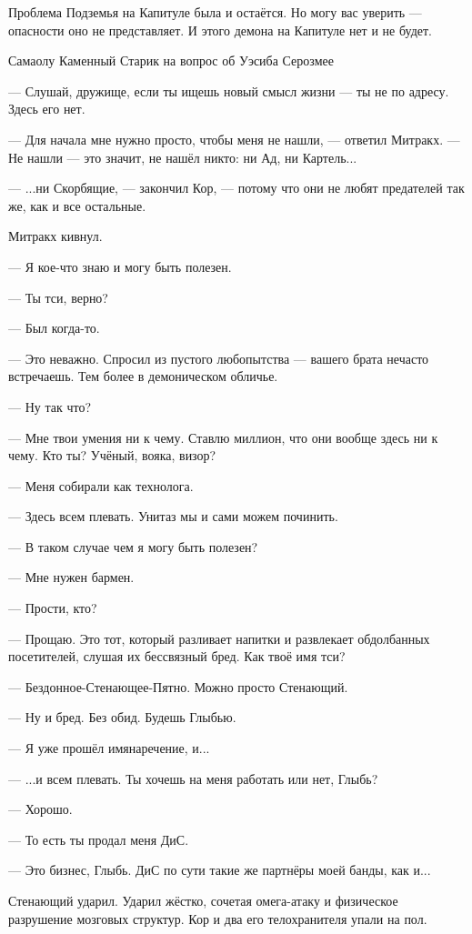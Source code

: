 \epigraph
{Проблема Подземья на Капитуле была и остаётся.
Но могу вас уверить --- опасности оно не представляет.
И этого демона на Капитуле нет и не будет.}
{Самаолу Каменный Старик на вопрос об Уэсиба Серозмее}

--- Слушай, дружище, если ты ищешь новый смысл жизни --- ты не по адресу.
Здесь его нет.

--- Для начала мне нужно просто, чтобы меня не нашли, --- ответил Митракх.
--- Не нашли --- это значит, не нашёл никто: ни Ад, ни Картель...

--- ...ни Скорбящие, --- закончил Кор, --- потому что они не любят предателей так же, как и все остальные.

Митракх кивнул.

--- Я кое-что знаю и могу быть полезен.

--- Ты тси, верно?

--- Был когда-то.

--- Это неважно.
Спросил из пустого любопытства --- вашего брата нечасто встречаешь.
Тем более в демоническом обличье.

--- Ну так что?

--- Мне твои умения ни к чему.
Ставлю миллион, что они вообще здесь ни к чему.
Кто ты?
Учёный, вояка, визор?

--- Меня собирали как технолога.

--- Здесь всем плевать.
Унитаз мы и сами можем починить.

--- В таком случае чем я могу быть полезен?

--- Мне нужен бармен.

--- Прости, кто?

--- Прощаю.
Это тот, который разливает напитки и развлекает обдолбанных посетителей, слушая их бессвязный бред.
Как твоё имя тси?

--- Бездонное-Стенающее-Пятно.
Можно просто Стенающий. %

--- Ну и бред.
Без обид.
Будешь Глыбью. %

--- Я уже прошёл имянаречение, и...

--- ...и всем плевать.
Ты хочешь на меня работать или нет, Глыбь?

--- Хорошо.

\razd

--- То есть ты продал меня ДиС.

--- Это бизнес, Глыбь.
ДиС по сути такие же партнёры моей банды, как и...

Стенающий ударил.
Ударил жёстко, сочетая омега-атаку и физическое разрушение мозговых структур.
Кор и два его телохранителя упали на пол.

